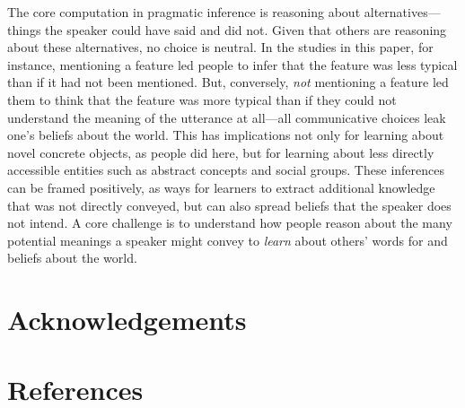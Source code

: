 \documentclass[
  english,
  man,floatsintext]{apa6}
\begin{document}
The core computation in pragmatic inference is reasoning about alternatives---things the speaker could have said and did not. Given that others are reasoning about these alternatives, no choice is neutral. In the studies in this paper, for instance, mentioning a feature led people to infer that the feature was less typical than if it had not been mentioned. But, conversely, \emph{not} mentioning a feature led them to think that the feature was more typical than if they could not understand the meaning of the utterance at all---all communicative choices leak one's beliefs about the world. This has implications not only for learning about novel concrete objects, as people did here, but for learning about less directly accessible entities such as abstract concepts and social groups. These inferences can be framed positively, as ways for learners to extract additional knowledge that was not directly conveyed, but can also spread beliefs that the speaker does not intend. A core challenge is to understand how people reason about the many potential meanings a speaker might convey to \emph{learn} about others' words for and beliefs about the world.

\hypertarget{acknowledgements}{%
\section{Acknowledgements}\label{acknowledgements}}

\newpage

\hypertarget{references}{%
\section{References}\label{references}}
\end{document}
